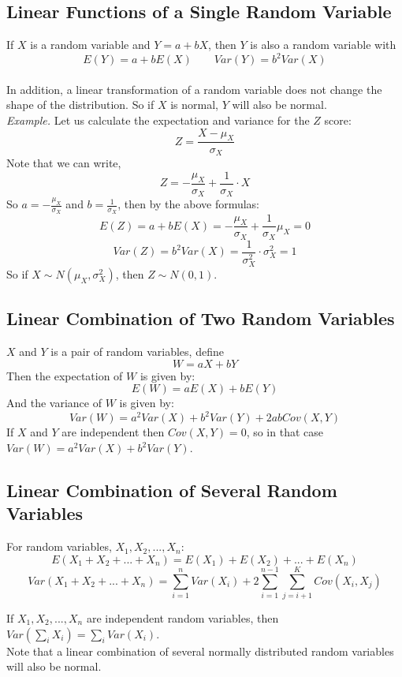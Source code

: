 \documentclass{./../../Latex/handout}
\begin{document}
\subsection{Linear Functions of a Single Random Variable}

If $X$ is a random variable and $Y=a+bX$, then $Y$ is also a random variable with 
$$ E(Y) = a + b E(X) \quad \quad Var(Y) = b^2 Var(X) $$ \\
In addition, a linear transformation of a random variable does not change the shape of the distribution. So if $X$ is normal, $Y$ will also be normal. \\

\textit{Example.} Let us calculate the expectation and variance for the $Z$ score:
$$ Z = \frac{X-\mu_X}{\sigma_X} $$
Note that we can write, $$ Z = -\frac{\mu_X}{\sigma_X} + \frac{1}{\sigma_X} \cdot X$$
So $a= -\frac{\mu_X}{\sigma_X}$ and $b = \frac{1}{\sigma_X}$, then by the above formulas:
$$ E(Z) = a + b E(X) =  -\frac{\mu_X}{\sigma_X} + \frac{1}{\sigma_X} \mu_X = 0 $$
$$ Var(Z) = b^2 Var(X)=   \frac{1}{\sigma_X^2} \cdot \sigma_X^2 = 1 $$
So if $X \sim N(\mu_X, \sigma^2_X)$, then $Z \sim N(0,1) $.

\subsection{Linear Combination of Two Random Variables}
$X$ and $Y$ is a pair of random variables, define $$W= aX + bY$$
Then the expectation of $W$ is given by:
$$ E(W) = a E(X) + b E(Y) $$
And the variance of $W$ is given by:
$$ Var(W) = a^2 Var(X) + b^2 Var(Y) + 2ab Cov(X,Y) $$
If $X$ and $Y$ are independent then $Cov(X,Y)=0$, so in that case $ Var(W) = a^2 Var(X) + b^2 Var(Y) $.

\subsection{Linear Combination of Several Random Variables}
 For random variables, $X_1,X_2,...,X_n$:
 $$ E(X_1 + X_2 + ... + X_n) = E(X_1) + E(X_2) + ...+ E(X_n) $$
$$ Var(X_1 + X_2 + ... + X_n) = \sum_{i=1}^n Var(X_i) + 2 \sum_{i=1}^{n-1} \sum_{j=i+1}^K Cov(X_i,X_j) $$

If $X_1,X_2,...,X_n$ are independent random variables, then $ Var\left(\sum_i X_i\right) = \sum_i Var (X_i)  $. \\

Note that a linear combination of several normally distributed random variables will also be normal.
\end{document}
